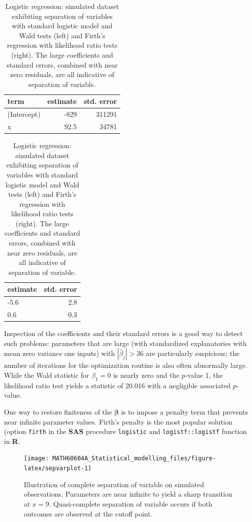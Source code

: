 \documentclass[
  11pt,
  letterpaper,
]{book}
\theoremstyle{definition}
\theoremstyle{definition}
\theoremstyle{definition}
\theoremstyle{remark}
\begin{document}
\begin{table}
\caption{\label{tab:quasisepvar}Logistic regression: simulated dataset exhibiting separation of variables with standard logistic model and Wald tests (left) and Firth's regression with likelihood ratio tests (right). The large coefficients and standard errors, combined with near zero residuals, are all indicative of separation of variable.}

\centering
\begin{tabular}[t]{lrr}
\toprule
term & estimate & std. error\\
\midrule
(Intercept) & -829 & 311291\\
x & 92.5 & 34781\\
\bottomrule
\end{tabular}
\centering
\begin{tabular}[t]{lr}
\toprule
estimate & std. error\\
\midrule
-5.6 & 2.8\\
0.6 & 0.3\\
\bottomrule
\end{tabular}
\end{table}

Inspection of the coefficients and their standard errors is a good way to detect such problems: parameters that are large (with standardized explanatories with mean zero variance one inputs) with \(|\widehat{\beta}_j| > 36\) are particularly suspicious; the number of iterations for the optimization routine is also often abnormally large. While the Wald statistic for \(\beta_1=0\) is nearly zero and the \(p\)-value 1, the likelihood ratio test yields a statistic of 20.016 with a negligible associated \(p\)-value.

One way to restore finiteness of the \(\boldsymbol{\beta}\) is to impose a penalty term that prevents near infinite parameter values. Firth's penalty is the most popular solution (option \texttt{firth} in the \textbf{SAS} procedure \texttt{logistic} and \texttt{logistf::logistf} function in \textbf{R}.

\begin{figure}

{\centering \texttt{[image: MATH60604A\_Statistical\_modelling\_files/figure-latex/sepvarplot-1]} 

}

\caption{Illustration of complete separation of variable on simulated observations. Parameters are near infinite to yield a sharp transition at $x=9$. Quasi-complete separation of variable occurs if both outcomes are observed at the cutoff point.}\label{fig:sepvarplot}
\end{figure}
\end{document}
